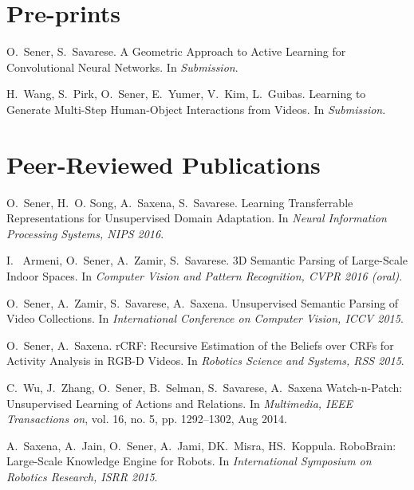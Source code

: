 
\section{\mysidestyle \textcolor{olgray}{Pre-prints}}

O.~Sener, S.~Savarese.
\newblock A Geometric Approach to Active Learning for Convolutional Neural Networks. 
\newblock In {\em Submission}.
\vspace{-2mm}

H.~Wang, S.~Pirk, O.~Sener, E.~Yumer, V.~Kim, L.~Guibas.
\newblock Learning to Generate Multi-Step Human-Object Interactions from Videos. 
\newblock In {\em Submission}.
\vspace{-2mm}

\newpage

\section{\mysidestyle \textcolor{olgray}{Peer-Reviewed Publications}}

O.~Sener, H.~O. Song, A.~Saxena, S.~Savarese.
\newblock Learning Transferrable Representations for Unsupervised Domain Adaptation. 
\newblock In {\em Neural Information Processing Systems, NIPS 2016}.
\vspace{-2mm}

I. ~Armeni, O.~Sener, A.~Zamir, S.~Savarese.
\newblock 3D Semantic Parsing of Large-Scale Indoor Spaces.
\newblock In {\em Computer Vision and Pattern Recognition, CVPR 2016 (oral)}.
\vspace{-2mm}

O.~Sener, A.~Zamir, S.~Savarese, A.~Saxena.
\newblock Unsupervised Semantic Parsing of Video Collections.
\newblock In {\em International Conference on Computer Vision, ICCV 2015}.
\vspace{-2mm}

O.~Sener, A.~Saxena.
\newblock rCRF: Recursive Estimation of the Beliefs over CRFs for Activity Analysis in RGB-D Videos.
\newblock In {\em Robotics Science and Systems, RSS 2015}.
\vspace{-2mm}


C.~Wu, J.~Zhang, O.~Sener, B.~Selman, S.~Savarese, A.~Saxena
\newblock Watch-n-Patch: Unsupervised Learning of Actions and Relations.
\newblock In {\em Multimedia, IEEE Transactions on}, vol. 16, no. 5, pp. 1292–1302, Aug 2014.


A.~Saxena, A.~Jain, O.~Sener, A.~Jami, DK.~Misra, HS.~Koppula.
\newblock RoboBrain: Large-Scale Knowledge Engine for Robots.
\newblock In {\em International Symposium on Robotics Research, ISRR 2015}.
\vspace{-2mm}

